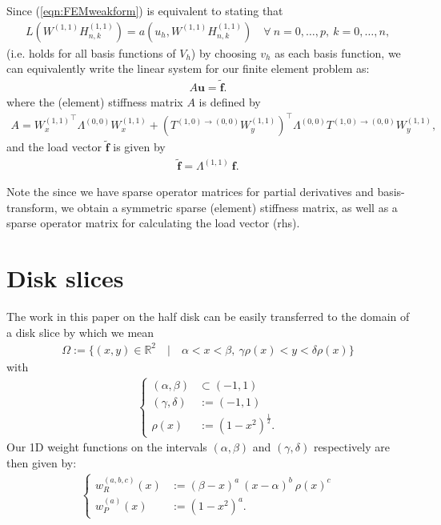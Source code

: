 \documentclass[11pt, oneside]{article}   	%
\newcommand{\half}{\frac{1}{2}}
\newcommand{\R}{\mathbb{R}}
\newcommand{\hdop}{H}
\newcommand{\Wii}{W^{(1,1)}}
\newcommand{\hdopii}{\hdop^{(1,1)}}
\newcommand{\genjac}{R}
\newcommand{\genjacw}{w_\genjac}
\begin{document}
Since (\ref{eqn:FEMweakform}) is equivalent to stating that
\begin{align*}
	L(\Wii \hdopii_{n,k}) = a(u_h,\Wii \hdopii_{n,k}) \quad \forall \: n = 0,\dots,p, \: k = 0,\dots,n,
\end{align*}
(i.e. holds for all basis functions of $V_h$) by choosing $v_h$ as each basis function, we can equivalently write the linear system for our finite element problem as:
\begin{align*}
A\mathbf{u} = \tilde{\mathbf{f}}.
\end{align*}
where the (element) stiffness matrix $A$ is defined by 
\begin{align*}
A = {\Wii_x}^\top \Lambda^{(0,0)} \Wii_x + ({T^{(1,0)\to(0,0)} \Wii_y})^\top \Lambda^{(0,0)} T^{(1,0)\to(0,0)} \Wii_y, 
\end{align*}
and the load vector $\tilde{\mathbf{f}}$ is given by 
\begin{align*}
\tilde{\mathbf{f}} = \Lambda^{(1,1)} \: \mathbf{f}.
\end{align*}

Note the since we have sparse operator matrices for partial derivatives and basis-transform, we obtain a symmetric sparse (element) stiffness matrix, as well as a sparse operator matrix for calculating the load vector (rhs).

\section{Disk slices}\label{Appendix:DiskSlices}

The work in this paper on the half disk can be easily transferred to the domain of a disk slice by which we mean
\begin{align*}
	\Omega := \{(x,y) \in \R^2 \quad | \quad \alpha < x < \beta, \: \gamma \rho(x) < y < \delta \rho(x)\}
\end{align*}
with 
\begin{align*}
\begin{cases}
(\alpha, \beta) &\subset (-1,1) \\
(\gamma, \delta) &:= (-1,1) \\
\rho(x) &:= (1-x^2)^{\half}.
\end{cases}
\end{align*}
Our 1D weight functions on the intervals $(\alpha, \beta)$ and $(\gamma, \delta)$ respectively are then given by:
\begin{align*}
\begin{cases}
\genjacw^{(a,b,c)}(x) &:= (\beta - x)^a \: (x - \alpha)^{b} \: \rho(x)^{c} \\
w^{(a)}_P(x) &:= (1-x^2)^a.
\end{cases}
\end{align*}
\end{document}
